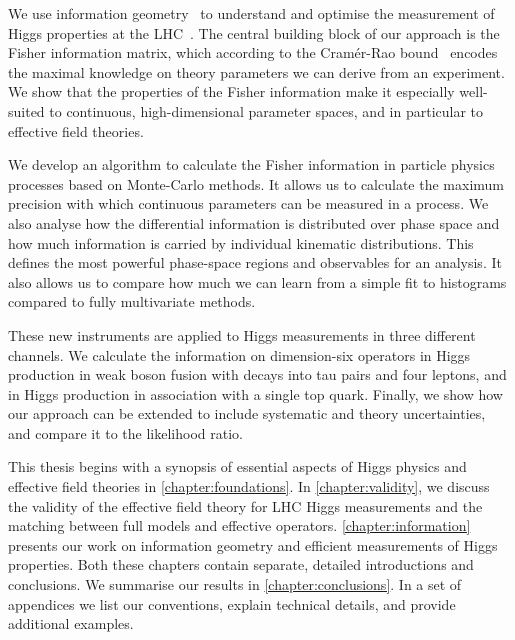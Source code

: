 %
We use information geometry~\cite{efron1975, amari1982, amari2000joho}
to understand and optimise the measurement of Higgs properties at the
LHC~\cite{Brehmer:2016nyr}.
%
The central building block of our approach is the Fisher information
matrix, which according to the Cram\'er-Rao bound~\cite{Rao:1945,
  Cramer:1946} encodes the maximal knowledge on theory parameters we
can derive from an experiment. We show that the properties of the
Fisher information make it especially well-suited to continuous,
high-dimensional parameter spaces, and in particular to effective
field theories.

We develop an algorithm to calculate the Fisher information in
particle physics processes based on Monte-Carlo methods. It allows us
to calculate the maximum precision with which continuous parameters
can be measured in a process. We also analyse how the differential
information is distributed over phase space and how much information
is carried by individual kinematic distributions. This defines the
most powerful phase-space regions and observables for an analysis. It
also allows us to compare how much we can learn from a simple fit to
histograms compared to fully multivariate methods.

These new instruments are applied to Higgs measurements in three
different channels. We calculate the information on dimension-six
operators in Higgs production in weak boson fusion with decays into
tau pairs and four leptons, and in Higgs production in association
with a single top quark. Finally, we show how our approach can be
extended to include systematic and theory uncertainties, and compare
it to the likelihood ratio.

\newparagraph
%
This thesis begins with a synopsis of essential aspects of Higgs
physics and effective field theories in
\autoref{chapter:foundations}. In \autoref{chapter:validity}, we
discuss the validity of the effective field theory for LHC Higgs
measurements and the matching between full models and effective
operators. \autoref{chapter:information} presents our work on
information geometry and efficient measurements of Higgs
properties. Both these chapters contain separate, detailed
introductions and conclusions. We summarise our results in
\autoref{chapter:conclusions}. In a set of appendices we list our
conventions, explain technical details, and provide additional
examples.
